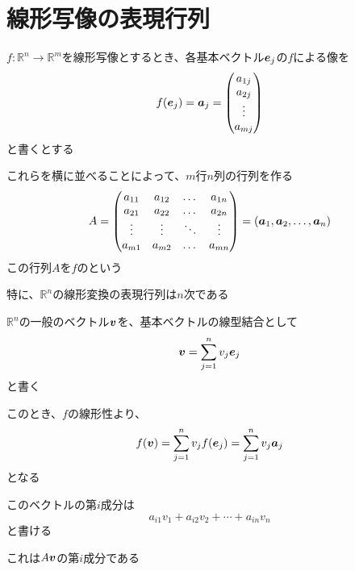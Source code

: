 \documentclass[../../../topic_linear-algebra]{subfiles}
\begin{document}
\sectionline
\section{線形写像の表現行列}\label{sec:matrix-rep-of-linear-maps}

$f\colon \mathbb{R}^n \to \mathbb{R}^m$を線形写像とするとき、各基本ベクトル$\vb*{e}_j$の$f$による像を
\begin{equation*}
  f(\vb*{e}_j) = \vb*{a}_j = \begin{pmatrix}
    a_{1j} \\
    a_{2j} \\
    \vdots \\
    a_{mj}
  \end{pmatrix}
\end{equation*}
と書くとする

これらを横に並べることによって、$m$行$n$列の行列を作る
\begin{equation*}
  A = \begin{pmatrix}
    a_{11} & a_{12} & \dots  & a_{1n} \\
    a_{21} & a_{22} & \dots  & a_{2n} \\
    \vdots & \vdots & \ddots & \vdots \\
    a_{m1} & a_{m2} & \dots  & a_{mn}
  \end{pmatrix} = (\vb*{a}_1, \vb*{a}_2, \dots, \vb*{a}_n)
\end{equation*}
この行列$A$を$f$のという

\br

特に、$\mathbb{R}^n$の線形変換の表現行列は$n$次である

\sectionline

$\mathbb{R}^n$の一般のベクトル$\vb*{v}$を、基本ベクトルの線型結合として
\begin{equation*}
  \vb*{v} = \sum_{j=1}^n v_j \vb*{e}_j
\end{equation*}
と書く

このとき、$f$の線形性より、
\begin{equation*}
  f(\vb*{v}) = \sum_{j=1}^n v_j f(\vb*{e}_j) = \sum_{j=1}^n v_j \vb*{a}_j
\end{equation*}
となる

このベクトルの第$i$成分は
\begin{equation*}
  a_{i1} v_1 + a_{i2} v_2 + \cdots + a_{in} v_n
\end{equation*}
と書ける

これは$A\vb*{v}$の第$i$成分である
\end{document}
